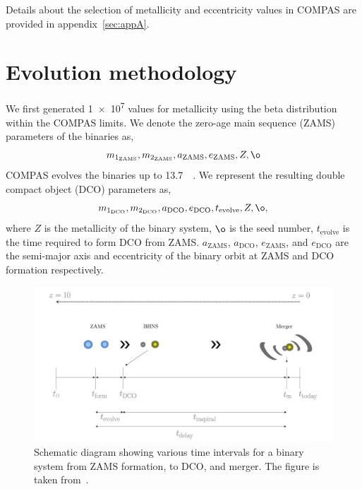 \documentclass[journal, twocolumn]{IEEEtran}
\newcommand{\mone}[1]{m_{1_{\text{#1}}}}
\newcommand{\mtwo}[1]{m_{2_{\text{#1}}}}
\newcommand{\semaxis}[1]{a_{\text{#1}}}
\newcommand{\ecc}[1]{e_\text{#1}}
\newcommand{\interval}[1]{t_\text{#1}}
\begin{document}
    Details about the selection of metallicity and eccentricity values in COMPAS are provided in appendix~\ref{sec:appA}.


    \section{Evolution methodology}
    \label{sec:evolution-methodology}
    We first generated \num{1e7} values for metallicity using the beta distribution within the COMPAS limits.
    We denote the zero-age main sequence (ZAMS) parameters of the binaries as,
    \begin{equation}%
        \mone{ZAMS}, \mtwo{ZAMS}, \semaxis{ZAMS}, \ecc{ZAMS}, Z, \o
        \label{eq:zams_parameter_names}
    \end{equation}%
    COMPAS evolves the binaries up to \SI{13.7}{\giga\yr}.
    We represent the resulting double compact object (DCO) parameters as,
    \begin{equation}%
        \mone{DCO}, \mtwo{DCO}, \semaxis{DCO}, \ecc{DCO}, \interval{evolve}, Z, \o,
        \label{eq:dco_parameter_names}
    \end{equation}%
    where $Z$ is the metallicity of the binary system, $\o$ is the seed number, $\interval{evolve}$ is the time required to form DCO from ZAMS. $\semaxis{ZAMS}$, $\semaxis{DCO}$, $\ecc{ZAMS}$, and $\ecc{DCO}$ are the semi-major axis and eccentricity of the binary orbit at ZAMS and DCO formation respectively.
    \begin{figure}[!ht]%
        \centering%
        \includegraphics[width=\linewidth]{images/binary_evolution}%
        \caption{Schematic diagram showing various time intervals for a binary system from ZAMS formation, to DCO, and merger. The figure is taken from~\cite{Riley2022}.}%
        \label{fig:binaryevolution}%
    \end{figure}%
\end{document}
